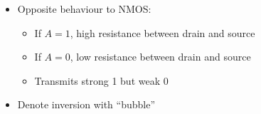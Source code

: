 


\begin{frame}[fragile]


\begin{itemize}
	\item Opposite behaviour to NMOS:
        \begin{itemize}
	\item	If $A=1$, high resistance between drain and source
	\item	If $A=0$, low resistance between drain and source
        \item   Transmits strong 1 but weak 0
	\end{itemize}
\item Denote inversion with ``bubble''
\end{itemize}
\BNotes\ifnum{}
~
\fi\ENotes
\end{frame}

